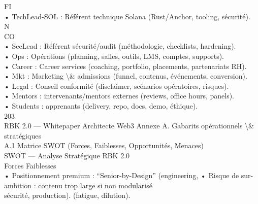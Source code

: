 FI\\
• TechLead-SOL : Référent technique Solana (Rust/Anchor, tooling, sécurité).\\
N\\
CO\\
• SecLead : Référent sécurité/audit (méthodologie, checklists, hardening).\\
\vspace{0.5em}
• Ops : Opérations (planning, salles, outils, LMS, comptes, supports).\\
\vspace{0.5em}
• Career : Career services (coaching, portfolio, placements, partenariats RH).\\
\vspace{0.5em}
• Mkt : Marketing \textbackslash{}& admissions (funnel, contenus, événements, conversion).\\
\vspace{0.5em}
• Legal : Conseil conformité (disclaimer, scénarios opératoires, risques).\\
\vspace{0.5em}
• Mentors : intervenants/mentors externes (reviews, office hours, panels).\\
\vspace{0.5em}
• Students : apprenants (delivery, repo, docs, demo, éthique).\\
\vspace{0.5em}
\vspace{0.5em}
203\\
RBK 2.0 — Whitepaper Architecte Web3                                                           Annexe A. Gabarits opérationnels \textbackslash{}& stratégiques\\
\vspace{0.5em}
\vspace{0.5em}
\vspace{0.5em}
A.1     Matrice SWOT (Forces, Faiblesses, Opportunités, Menaces)\\
SWOT — Analyse Stratégique RBK 2.0\\
\vspace{0.5em}
\vspace{0.5em}
Forces                                                                Faiblesses\\
• Positionnement premium : “Senior-by-Design” (engineering,      • Risque de sur-ambition : contenu trop large si non modularisé\\
sécurité, production).                                           (fatigue, dilution).\\
